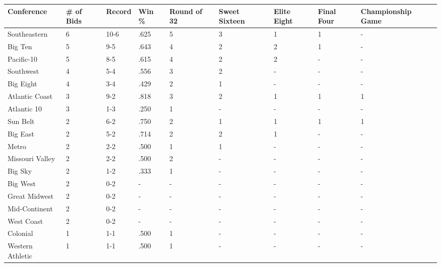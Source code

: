 \documentclass{article}
\begin{document}
\begin{tabular}{lllllllll}
\toprule
Conference & \# of Bids & Record & Win \% & Round of 32 & Sweet Sixteen & Elite Eight & Final Four & Championship Game \\
\midrule
Southeastern & 6 & 10-6 & .625 & 5 & 3 & 1 & 1 & - \\
Big Ten & 5 & 9-5 & .643 & 4 & 2 & 2 & 1 & - \\
Pacific-10 & 5 & 8-5 & .615 & 4 & 2 & 2 & - & - \\
Southwest & 4 & 5-4 & .556 & 3 & 2 & - & - & - \\
Big Eight & 4 & 3-4 & .429 & 2 & 1 & - & - & - \\
Atlantic Coast & 3 & 9-2 & .818 & 3 & 2 & 1 & 1 & 1 \\
Atlantic 10 & 3 & 1-3 & .250 & 1 & - & - & - & - \\
Sun Belt & 2 & 6-2 & .750 & 2 & 1 & 1 & 1 & 1 \\
Big East & 2 & 5-2 & .714 & 2 & 2 & 1 & - & - \\
Metro & 2 & 2-2 & .500 & 1 & 1 & - & - & - \\
Missouri Valley & 2 & 2-2 & .500 & 2 & - & - & - & - \\
Big Sky & 2 & 1-2 & .333 & 1 & - & - & - & - \\
Big West & 2 & 0-2 & - & - & - & - & - & - \\
Great Midwest & 2 & 0-2 & - & - & - & - & - & - \\
Mid-Continent & 2 & 0-2 & - & - & - & - & - & - \\
West Coast & 2 & 0-2 & - & - & - & - & - & - \\
Colonial & 1 & 1-1 & .500 & 1 & - & - & - & - \\
Western Athletic & 1 & 1-1 & .500 & 1 & - & - & - & - \\
\bottomrule
\end{tabular}
\end{document}
